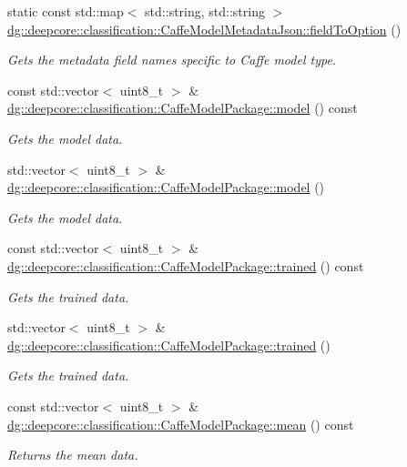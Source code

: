 \begin{DoxyCompactItemize}
static const std\+::map$<$ std\+::string, std\+::string $>$ \hyperlink{group___classification_module_ga902389ddc019d347447a900ad76cf8f3}{dg\+::deepcore\+::classification\+::\+Caffe\+Model\+Metadata\+Json\+::field\+To\+Option} ()
\begin{DoxyCompactList}\small\item\em Gets the metadata field names specific to Caffe model type. \end{DoxyCompactList}\item 
const std\+::vector$<$ uint8\+\_\+t $>$ \& \hyperlink{group___classification_module_gaa62fc3b5391b279e26f1ef7140f51217}{dg\+::deepcore\+::classification\+::\+Caffe\+Model\+Package\+::model} () const 
\begin{DoxyCompactList}\small\item\em Gets the model data. \end{DoxyCompactList}\item 
std\+::vector$<$ uint8\+\_\+t $>$ \& \hyperlink{group___classification_module_gadaf4382bc554e534107ba578956b9431}{dg\+::deepcore\+::classification\+::\+Caffe\+Model\+Package\+::model} ()
\begin{DoxyCompactList}\small\item\em Gets the model data. \end{DoxyCompactList}\item 
const std\+::vector$<$ uint8\+\_\+t $>$ \& \hyperlink{group___classification_module_gabd25f1f8b96431128dbd5e1f2dbd6e51}{dg\+::deepcore\+::classification\+::\+Caffe\+Model\+Package\+::trained} () const 
\begin{DoxyCompactList}\small\item\em Gets the trained data. \end{DoxyCompactList}\item 
std\+::vector$<$ uint8\+\_\+t $>$ \& \hyperlink{group___classification_module_gab25e04015819d180c69e52aed3992855}{dg\+::deepcore\+::classification\+::\+Caffe\+Model\+Package\+::trained} ()
\begin{DoxyCompactList}\small\item\em Gets the trained data. \end{DoxyCompactList}\item 
const std\+::vector$<$ uint8\+\_\+t $>$ \& \hyperlink{group___classification_module_gaf96a25edff440f66fe6faba94ff1af66}{dg\+::deepcore\+::classification\+::\+Caffe\+Model\+Package\+::mean} () const 
\begin{DoxyCompactList}\small\item\em Returns the mean data. \end{DoxyCompactList}\item 

\end{DoxyCompactItemize}
